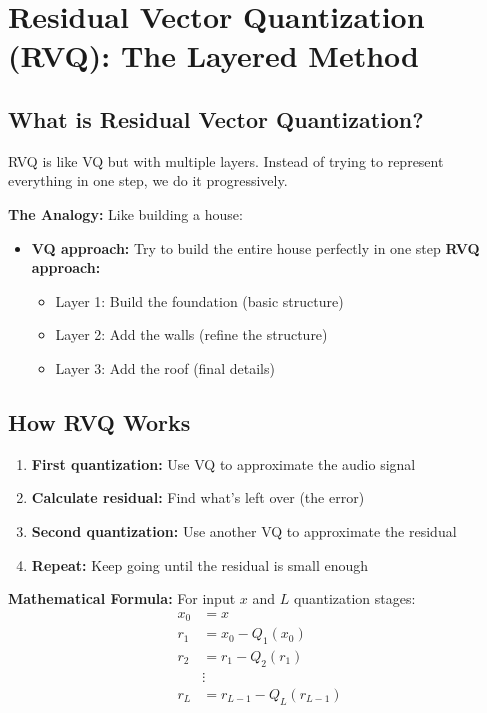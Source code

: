 \documentclass[12pt]{article}
\begin{document}
\section{Residual Vector Quantization (RVQ): The Layered Method}

\subsection{What is Residual Vector Quantization?}

RVQ is like VQ but with multiple layers. Instead of trying to represent everything in one step, we do it progressively.

\textbf{The Analogy:} Like building a house:
\begin{itemize}
    \item \textbf{VQ approach:} Try to build the entire house perfectly in one step
    \textbf{RVQ approach:} 
    \begin{itemize}
        \item Layer 1: Build the foundation (basic structure)
        \item Layer 2: Add the walls (refine the structure)
        \item Layer 3: Add the roof (final details)
    \end{itemize}
\end{itemize}

\subsection{How RVQ Works}

\begin{enumerate}
    \item \textbf{First quantization:} Use VQ to approximate the audio signal
    \item \textbf{Calculate residual:} Find what's left over (the error)
    \item \textbf{Second quantization:} Use another VQ to approximate the residual
    \item \textbf{Repeat:} Keep going until the residual is small enough
\end{enumerate}

\textbf{Mathematical Formula:} For input $x$ and $L$ quantization stages:
\begin{align}
x_0 &= x \\
r_1 &= x_0 - Q_1(x_0) \\
r_2 &= r_1 - Q_2(r_1) \\
&\vdots \\
r_L &= r_{L-1} - Q_L(r_{L-1})
\end{align}
\end{document}
